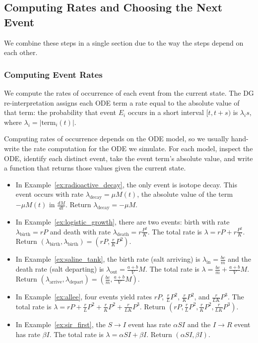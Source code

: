 \subsection{Computing Rates and Choosing the Next Event}\label{subsec:compute_pmf}

We combine these steps in a single section due to the way the steps depend on each other.

\subsubsection{Computing Event Rates}\label{subsubsec:compute_rates}

We compute the rates of occurrence of each event from the current state. The DG re-interpretation assigns each ODE term a rate equal to the absolute value of that term: the probability that event $E_i$ occurs in a short interval $[t, t+s)$ is $\lambda_i s$, where $\lambda_i = \left|\text{term}_i(t)\right|$.

Computing rates of occurrence depends on the ODE model, so we usually hand-write the rate computation for the ODE we simulate.
For each model, inspect the ODE, identify each distinct event, take the event term's absolute value, and write a function that returns those values given the current state.
\begin{itemize}
\item In Example~\ref{ex:radioactive_decay}, the only event is isotope decay. This event occurs with rate $\lambda_{\mathrm{decay}} = \mu M(t)$, the absolute value of the term $-\mu M(t)$ in $\frac{dM}{dt}$. Return $\lambda_{\mathrm{decay}} = -\mu M$.

\item In Example~\ref{ex:logistic_growth}, there are two events: birth with rate $\lambda_{\mathrm{birth}} = rP$ and death with rate $\lambda_{\mathrm{death}} = r\frac{P^2}{K}$. The total rate is $\lambda = rP + r\frac{P^2}{K}$. Return $(\lambda_{\mathrm{birth}}, \lambda_{\mathrm{birth}}) = (rP, \frac{r}{K}P^2)$.

\item In Example~\ref{ex:saline_tank}, the birth rate (salt arriving) is $\lambda_{\mathrm{in}} = \frac{bc}{m}$ and the death rate (salt departing) is $\lambda_{\mathrm{out}} = \frac{a+b}{V}M$. The total rate is $\lambda = \frac{bc}{m} + \frac{a+b}{V}M$.  Return $(\lambda_{\mathrm{arrive}}, \lambda_{\mathrm{depart}}) = (\frac{bc}{m}, \frac{a+b}{V}M)$.

\item In Example~\ref{ex:allee}, four events yield rates $rP$, $\frac{r}{L}P^2$, $\frac{r}{K}P^2$, and $\frac{r}{LK}P^3$. The total rate is $\lambda = rP + \frac{r}{L}P^2 + \frac{r}{K}P^2 + \frac{r}{LK}P^3$. Return $(rP, \frac{r}{L}P^2, \frac{r}{K}P^2, \frac{r}{LK}P^3)$.

\item In Example~\ref{ex:sir_first}, the $S\to I$ event has rate $\alpha SI$ and the $I\to R$ event has rate $\beta I$. The total rate is $\lambda = \alpha SI + \beta I$. Return $(\alpha SI, \beta I)$.
\end{itemize}

